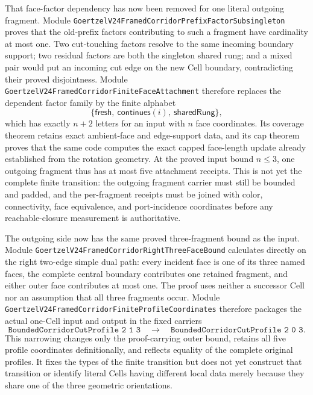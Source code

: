 \documentclass[11pt]{article}
\theoremstyle{definition}
\begin{document}
That face-factor dependency has now been removed for one literal outgoing
fragment.  Module
\texttt{GoertzelV24FramedCorridorPrefixFactorSubsingleton} proves that the
old-prefix factors contributing to such a fragment have cardinality at most
one.  Two cut-touching factors resolve to the same incoming boundary support;
two residual factors are both the singleton shared rung; and a mixed pair
would put an incoming cut edge on the new Cell boundary, contradicting their
proved disjointness.  Module
\texttt{GoertzelV24FramedCorridorFiniteFaceAttachment} therefore replaces the
dependent factor family by the finite alphabet
\[
  \{\mathsf{fresh},\ \mathsf{continues}(i),\ \mathsf{sharedRung}\},
\]
which has exactly $n+2$ letters for an input with $n$ face coordinates.  Its
coverage theorem retains exact ambient-face and edge-support data, and its cap
theorem proves that the same code computes the exact capped face-length update
already established from the rotation geometry.  At the proved input bound
$n\leq 3$, one outgoing fragment thus has at most five attachment receipts.
This is not yet the complete finite transition: the outgoing fragment carrier
must still be bounded and padded, and the per-fragment receipts must be joined
with color, connectivity, face equivalence, and port-incidence coordinates
before any reachable-closure measurement is authoritative.

The outgoing side now has the same proved three-fragment bound as the input.
Module
\texttt{GoertzelV24FramedCorridorRightThreeFaceBound} calculates directly on
the right two-edge simple dual path: every incident face is one of its three
named faces, the complete central boundary contributes one retained fragment,
and either outer face contributes at most one.  The proof uses neither a
successor Cell nor an assumption that all three fragments occur.  Module
\texttt{GoertzelV24FramedCorridorFiniteProfileCoordinates} therefore packages
the actual one-Cell input and output in the fixed carriers
\[
 \texttt{BoundedCorridorCutProfile 2 1 3}
 \quad\longrightarrow\quad
 \texttt{BoundedCorridorCutProfile 2 0 3}.
\]
This narrowing changes only the proof-carrying outer bound, retains all five
profile coordinates definitionally, and reflects equality of the complete
original profiles.  It fixes the types of the finite transition but does not
yet construct that transition or identify literal Cells having different
local data merely because they share one of the three geometric orientations.
\end{document}
